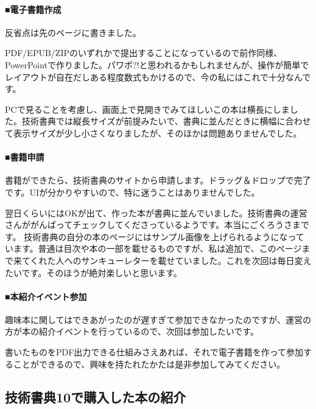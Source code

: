 \documentclass[dvipdfmx,autodetect-engine,10pt,b5paper,papersize,openany,dvipsnames]{jsbook}
\begin{document}
\begin{multicols}{2}
\paragraph{\gtfamily\bfseries ■電子書籍作成}

反省点は先のページに書きました。

PDF/EPUB/ZIPのいずれかで提出することになっているので前作同様、PowerPointで作りました。パワポ?!と思われるかもしれませんが、操作が簡単でレイアウトが自在だしある程度数式もかけるので、今の私にはこれで十分なんです。

PCで見ることを考慮し、画面上で見開きでみてほしいこの本は横長にしました。技術書典では縦長サイズが前提みたいで、書典に並んだときに横幅に合わせて表示サイズが少し小さくなりましたが、そのほかは問題ありませんでした。

\paragraph{\gtfamily\bfseries ■書籍申請}

書籍ができたら、技術書典のサイトから申請します。ドラッグ＆ドロップで完了です。UIが分かりやすいので、特に迷うことはありませんでした。

翌日くらいにはOKが出て、作った本が書典に並んでいました。技術書典の運営さんががんばってチェックしてくださっているようです。本当にごくろうさまです。
技術書典の自分の本のページにはサンプル画像を上げられるようになっています。普通は目次や本の一部を載せるものですが、私は追加で、このページまで来てくれた人へのサンキューレターを載せていました。これを次回は毎日変えたいです。そのほうが絶対楽しいと思います。

\paragraph{\gtfamily\bfseries ■本紹介イベント参加}

趣味本に関してはできあがったのが遅すぎて参加できなかったのですが、運営の方が本の紹介イベントを行っているので、次回は参加したいです。

書いたものをPDF出力できる仕組みさえあれば、それで電子書籍を作って参加することができるので、興味を持たれたかたは是非参加してみてください。
 
\end{multicols}


\subsection*{技術書典10で購入した本の紹介}
\end{document}
